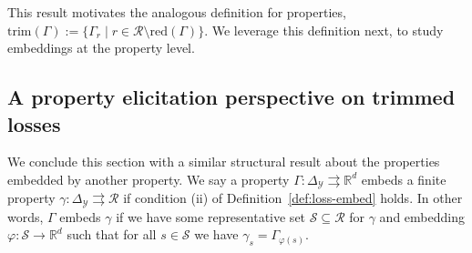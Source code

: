 \documentclass[11pt]{article}
\newcommand{\reals}{\mathbb{R}}
\newcommand{\simplex}{\Delta_\Y}
\newcommand{\R}{\mathcal{R}}
\newcommand{\Sc}{\mathcal{S}}
\newcommand{\Y}{\mathcal{Y}}
\newcommand{\toto}{\rightrightarrows}
\newcommand{\red}{\mathrm{red}}
\newcommand{\trimred}{\mathrm{trim}}
\begin{document}
This result motivates the analogous definition for properties, $\trimred(\Gamma) := \{\Gamma_r \mid r \in \R\setminus\red(\Gamma)\}$.
We leverage this definition next, to study embeddings at the property level.

\subsection{A property elicitation perspective on trimmed losses}

We conclude this section with a similar structural result about the properties embedded by another property.
We say a property $\Gamma:\simplex\toto\reals^d$ embeds a finite property $\gamma:\simplex\toto\R$ if condition (ii) of Definition~\ref{def:loss-embed} holds.
In other words, $\Gamma$ embeds $\gamma$ if we have some representative set $\Sc\subseteq\R$ for $\gamma$ and embedding $\varphi:\Sc\to\reals^d$ such that for all $s\in\Sc$ we have $\gamma_s = \Gamma_{\varphi(s)}$.
\end{document}
